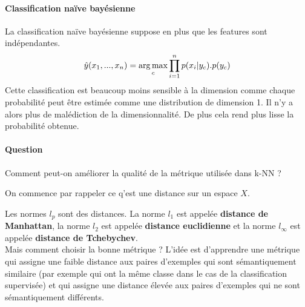 \paragraph{Classification naïve bayésienne}
La classification naïve bayésienne suppose en plus que les features sont indépendantes.
$$ \hat{y}(x_1, ..., x_n) = \operatorname*{arg\,max}_c \prod_{i=1}^n p(x_i | y_c).p(y_c) $$
Cette classification est beaucoup moins sensible à la dimension comme chaque probabilité peut être estimée comme une distribution de dimension 1. Il n'y a alors plus de malédiction de la dimensionnalité. De plus cela rend plus lisse la probabilité obtenue.

\paragraph{Question} Comment peut-on améliorer la qualité de la métrique utilisée dans k-NN ?


On commence par rappeler ce q'est une distance sur un espace $X$.


Les normes $l_p$ sont des distances. La norme $l_1$ est appelée \textbf{distance de Manhattan}, la norme $l_2$ est appelée \textbf{distance euclidienne} et la norme $l_\infty$ est appelée \textbf{distance de Tchebychev}. \\
Mais comment choisir la bonne métrique ? L'idée est d'apprendre une métrique qui assigne une faible distance aux paires d'exemples qui sont sémantiquement similaire (par exemple qui ont la même classe dans le cas de la classification supervisée) et qui assigne une distance élevée aux paires d'exemples qui ne sont sémantiquement différents.

